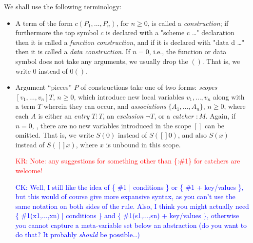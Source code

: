 \documentclass[letterpaper,11pt]{article}
\newcommand{\CK}[1]{\textcolor{blue}{CK: #1}}
\newcommand{\KR}[1]{\textcolor{red}{KR: #1}}
\newcommand{\MS}[1]{\textcolor{violet}{MS: #1}}
\begin{document}
We shall use the following terminology:
\begin{itemize}

\item A term of the form $c(P_1,…,P_n)$, for $n≥0$, is called a \emph{construction}; if furthermore
  the top symbol $c$ is declared with a "scheme c {…}" declaration then it is called a
  \emph{function construction}, and if it is declared with "data d {…}" then it is called a
  \emph{data construction}. If $n=0$, i.e., the function or data symbol does not take any arguments,
  we usually drop the $()$. That is, we write $0$ instead of $0()$.
    

\item Argument ``pieces'' $P$ of constructions take one of two forms: \emph{scopes} $[v_1,…,v_n]T$,
  $n≥0$, which introduce new local variables $v_1,…,v_n$ along with a term $T$ wherein they can
  occur, and \emph{associations} $\{A_1,…,A_n\}$, $n≥0$, where each $A$ is either an \emph{entry}
  $T:T$, an \emph{exclusion} $¬T$, or a \emph{catcher} ${:}M$. Again, if $n=0$, \ie, there are no
  new variables introduced in the scope $[]$ can be omitted. That is, we write $S(0)$ instead of
  $S([]0)$, and also $S(x)$ instead of $S([]x)$, where $x$ is unbound in this scope.

  \KR{Note: any suggestions for something other than \{:\#1\} for catchers are welcome!}

  \CK{Well, I still like the idea of \{ \#1 | conditions \} or \{ \#1 + key/values \}, but this
    would of course give more expansive syntax, as you can't use the same notation on both sides
    of the rule.  Also, I think you might actually need \{ \#1(x1,...,xn) | conditions \} and
    \{ \#1(s1,...,sn) + key/values \}, otherwise you cannot capture a meta-variable set below an
    abstraction (do you want to do that? It probably \emph{should} be possible\dots)}


\end{itemize}
\end{document}
